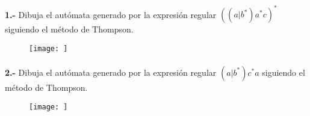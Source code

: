 \documentclass[11pt,a4paper]{report}
\begin{document}
\paragraph{}

\paragraph{}
\textbf{1.-} Dibuja el autómata generado por la expresión regular $ ((a|b^*)a^*c)^* $ siguiendo el método de Thompson.
\begin{figure}[ht!]
\centering
\texttt{[image: ]}
\end{figure}\paragraph{}
\textbf{2.-} Dibuja el autómata generado por la expresión regular $ (a|b^*)c^*a $ siguiendo el método de Thompson.
\begin{figure}[ht!]
\centering
\texttt{[image: ]}
\end{figure}
\end{document}
